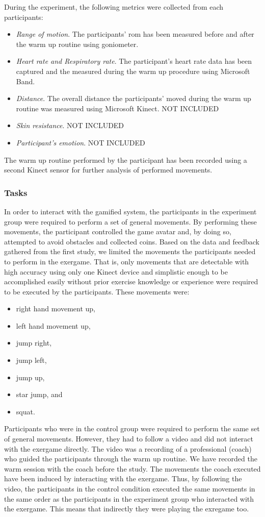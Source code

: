 During the experiment, the following metrics were collected from each participants:
\begin{itemize}
\item \textit{Range of motion}. The participants' \acrshort{rom} has been measured before and after the warm up routine using goniometer.
\item \textit{Heart rate and Respiratory rate}. The participant's heart rate data has been captured and the measured during the warm up procedure using Microsoft Band.
\item \textit{Distance}. The overall distance the participants' moved during the warm up routine was measured using Microsoft Kinect. NOT INCLUDED
\item \textit{Skin resistance}. NOT INCLUDED
\item \textit{Participant's emotion}. NOT INCLUDED
\end{itemize}
The warm up routine performed by the participant has been recorded using a second Kinect sensor for further analysis of performed movements.
\subsubsection{Tasks}
In order to interact with the gamified system, the participants in the experiment group were required to perform a set of general movements. By performing these movements, the participant controlled the game avatar and, by doing so, attempted to avoid obstacles and collected coins. Based on the data and feedback gathered from the first study, we limited the movements the participants needed to perform in the exergame. That is, only movements that are detectable with high accuracy using only one Kinect device and simplistic enough to be accomplished easily without prior exercise knowledge or experience were required to be executed by the participants. These movements were: 
\begin{itemize}
\item right hand movement up,
\item left hand movement up,
\item jump right,
\item jump left,
\item jump up, 
\item star jump, and
\item squat.
\end{itemize}
Participants who were in the control group were required to perform the same set of general movements. However, they had to follow a video and did not interact with the exergame directly. The video was a recording of a professional (coach) who guided the participants through the warm up routine. We have recorded the warm session with the coach before the study. The movements the coach executed have been induced by interacting with the exergame. Thus, by following the video, the participants in the control condition executed the same movements in the same order as the participants in the experiment group who interacted with the exergame. This means that indirectly they were playing the exregame too.
